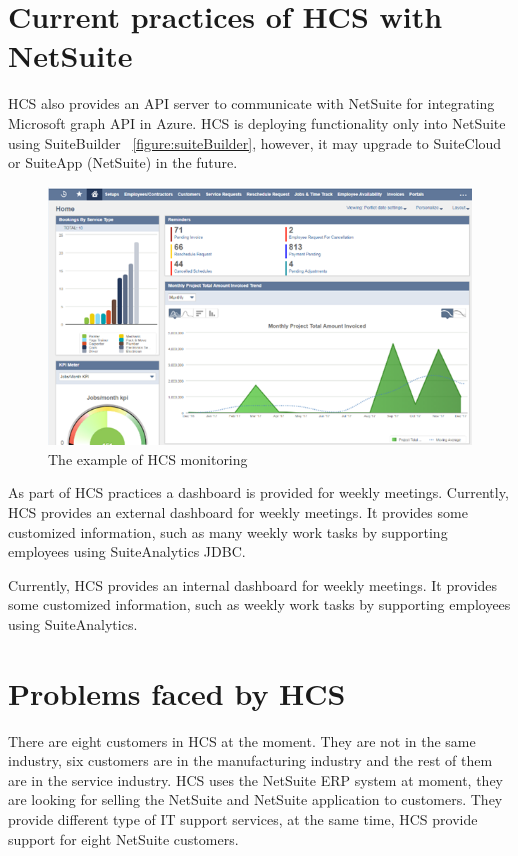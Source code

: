 \section{Current practices of HCS with NetSuite}

HCS also provides an API server to communicate with NetSuite for integrating Microsoft graph API in Azure. HCS is deploying functionality only into NetSuite using SuiteBuilder ~\ref{figure:suiteBuilder}, however, it may upgrade to SuiteCloud or SuiteApp (NetSuite) in the future.

\begin{figure}[!htb]
    \centering 
    \includegraphics[scale=0.7]{resource/HCSNetSuite.png}
    \caption{The example of HCS monitoring}
    \label{figure:hcsMonitor}
\end{figure}


As part of HCS practices a dashboard is provided for weekly meetings.
Currently, HCS provides an external dashboard for weekly meetings. It provides some customized information, such as many weekly work tasks by supporting employees using SuiteAnalytics JDBC.

Currently, HCS provides an internal dashboard for weekly meetings. It provides some customized information, such as weekly work tasks by supporting employees using SuiteAnalytics.






\section{Problems faced by HCS}

There are eight customers in HCS at the moment. They are not in the same industry, six customers are in the manufacturing industry and the rest of them are in the service industry. HCS uses the NetSuite ERP system at moment, they are looking for selling the NetSuite and NetSuite application to customers. They provide different type of IT support services, at the same time, HCS provide support for eight NetSuite customers. 

